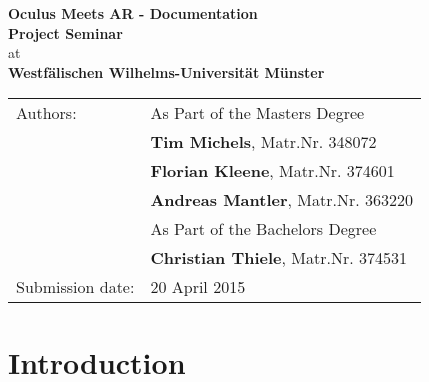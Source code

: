 



	\begin{center}
		\vspace*{54mm}
		{
			\renewcommand{\baselinestretch}{0.9}\normalsize
			\Large
			\textbf{Oculus Meets AR - Documentation}\\
		}
		\vspace*{15.5mm}
		{
			\large
			\textbf{Project Seminar}\\
		}
		\vspace*{10mm}
		{
			at\\
			\textbf{Westfälischen Wilhelms-Universität Münster}\\
		}
		\vspace*{80mm}
		\begin{tabular*}{137mm}{ll}
			Authors:  & As Part of the Masters Degree \\
						& \textbf{Tim Michels}, Matr.Nr. 348072\\
						& \textbf{Florian Kleene}, Matr.Nr. 374601\\
						& \textbf{Andreas Mantler}, Matr.Nr. 363220\\
						& As Part of the Bachelors Degree\\
						& \textbf{Christian Thiele}, Matr.Nr. 374531\\
			Submission date: 	& 20 April 2015
		\end{tabular*}
	\end{center}
	\newpage
	
	\thispagestyle{empty}\quad\newpage
	
	\thispagestyle{empty}
	\tableofcontents
	\vfill
	\newpage

	\thispagestyle{empty}\quad\newpage
	
	\setcounter{page}{1}
	\pagestyle{scrheadings}
	\setfootsepline{0pt} 
	\ihead[\chaptername\ \thechapter: \leftmark]{\chaptername\ \thechapter: \leftmark}
	\cfoot[\vspace*{9mm}\pagemark]{\vspace*{9mm}\pagemark}
	\renewcommand{\baselinestretch}{1.3}\normalsize

	\chapter{Introduction}
	\label{sec:introduction}
		

